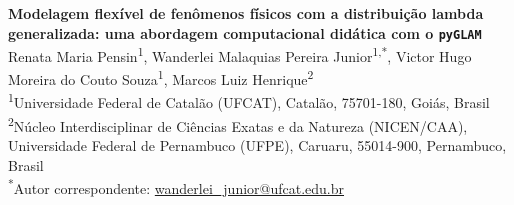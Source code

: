 \begin{center}
{\Large\bfseries Modelagem flexível de fenômenos físicos com a distribuição lambda
generalizada: uma abordagem computacional didática com o \texttt{pyGLAM}}
\\[2ex]

{\small
  Renata Maria Pensin\textsuperscript{1},
  Wanderlei Malaquias Pereira Junior\textsuperscript{1,*},
  Victor Hugo Moreira do Couto Souza\textsuperscript{1},
  Marcos Luiz Henrique\textsuperscript{2}
}
\\[1ex]

{\footnotesize
  \textsuperscript{1}Universidade Federal de Catal\~ao (UFCAT), Catal\~ao,
  75701-180, Goi\'as, Brasil \\[0.3ex]
  \textsuperscript{2}N\'ucleo Interdisciplinar de Ci\^encias Exatas e da
  Natureza (NICEN/CAA), Universidade Federal de Pernambuco (UFPE), Caruaru,
  55014-900, Pernambuco, Brasil
}
\\[0.8ex]

{\footnotesize \textsuperscript{*}Autor correspondente:
\href{mailto:wanderlei_junior@ufcat.edu.br}{wanderlei\_junior@ufcat.edu.br}}
\end{center}
